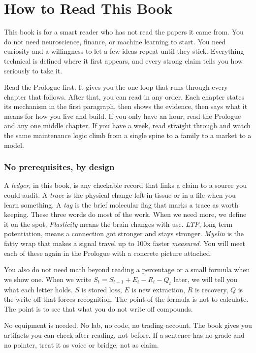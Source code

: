 \chapter{How to Read This Book}

This book is for a smart reader who has not read the papers it came from. You do not need neuroscience, finance, or machine learning to start. You need curiosity and a willingness to let a few ideas repeat until they stick. Everything technical is defined where it first appears, and every strong claim tells you how seriously to take it.

Read the Prologue first. It gives you the one loop that runs through every chapter that follows. After that, you can read in any order. Each chapter states its mechanism in the first paragraph, then shows the evidence, then says what it means for how you live and build. If you only have an hour, read the Prologue and any one middle chapter. If you have a week, read straight through and watch the same maintenance logic climb from a single spine to a family to a market to a model.

\subsection*{No prerequisites, by design}

A \textit{ledger}, in this book, is any checkable record that links a claim to a source you could audit. A \textit{trace} is the physical change left in tissue or in a file when you learn something. A \textit{tag} is the brief molecular flag that marks a trace as worth keeping. These three words do most of the work. When we need more, we define it on the spot. \textit{Plasticity} means the brain changes with use. \textit{LTP}, long term potentiation, means a connection got stronger and stays stronger. \textit{Myelin} is the fatty wrap that makes a signal travel up to 100x faster \textit{measured}. You will meet each of these again in the Prologue with a concrete picture attached.

You also do not need math beyond reading a percentage or a small formula when we show one. When we write $S_t = S_{t-1} + E_t - R_t - Q_t$ later, we will tell you what each letter holds. $S$ is stored loss, $E$ is new extraction, $R$ is recovery, $Q$ is the write off that forces recognition. The point of the formula is not to calculate. The point is to see that what you do not write off compounds.

No equipment is needed. No lab, no code, no trading account. The book gives you artifacts you can check after reading, not before. If a sentence has no grade and no pointer, treat it as voice or bridge, not as claim.

